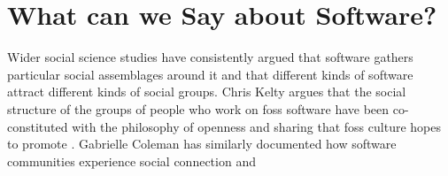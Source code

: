 \documentclass[a4paper,man,natbib]{apa6}
\begin{document}
   \section*{What can we Say about Software?}
   Wider social science studies have consistently argued that software gathers particular social assemblages around it and that different kinds of software attract different kinds of social groups. Chris Kelty argues that the social structure of the groups of people who work on \acrshort{foss} software have been co-constituted with the philosophy of openness and sharing that \acrshort{foss} culture hopes to promote \citep{**kelty}. Gabrielle Coleman has similarly documented how software communities experience social connection and 

   
   
  
   \printnoidxglossaries
   \setlength{\parindent}{4em}
   
\end{document}
